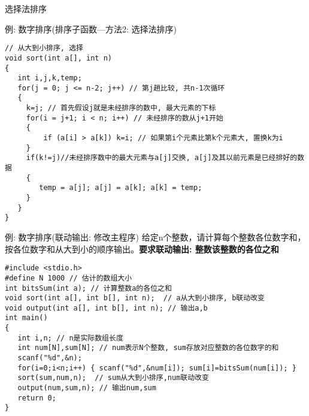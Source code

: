 \begin{frame}{选择法排序}
\end{frame}


\begin{frame}{例: 数字排序(排序子函数---方法2: 选择法排序)}
\vspace{-0.3cm}
\begin{lstlisting}
// 从大到小排序, 选择
void sort(int a[], int n)
{
   int i,j,k,temp;
   for(j = 0; j <= n-2; j++) // 第j趟比较, 共n-1次循环
   {
     k=j; // 首先假设j就是未经排序的数中, 最大元素的下标
     for(i = j+1; i < n; i++) // 未经排序的数从j+1开始
     {
         if (a[i] > a[k]) k=i; // 如果第i个元素比第k个元素大, 置换k为i
     }
     if(k!=j)//未经排序数中的最大元素与a[j]交换, a[j]及其以前元素是已经排好的数据
     { 
        temp = a[j]; a[j] = a[k]; a[k] = temp; 
     }
   }
}
\end{lstlisting}
\end{frame}

\begin{frame}{例: 数字排序(联动输出: 修改主程序)}
给定n个整数，请计算每个整数各位数字和，按各位数字和从大到小的顺序输出。\textbf{要求联动输出: 整数\quad 该整数的各位之和}
\begin{lstlisting}
#include <stdio.h>
#define N 1000 // 估计的数组大小
int bitsSum(int a); // 计算整数a的各位之和
void sort(int a[], int b[], int n);  // a从大到小排序, b联动改变
void output(int a[], int b[], int n); // 输出a,b
int main()
{
   int i,n; // n是实际数组长度 
   int num[N],sum[N]; // num表示N个整数, sum存放对应整数的各位数字的和  
   scanf("%d",&n);
   for(i=0;i<n;i++) { scanf("%d",&num[i]); sum[i]=bitsSum(num[i]); }
   sort(sum,num,n);  // sum从大到小排序,num联动改变
   output(num,sum,n); // 输出num,sum
   return 0;
}
\end{lstlisting}
\end{frame}

